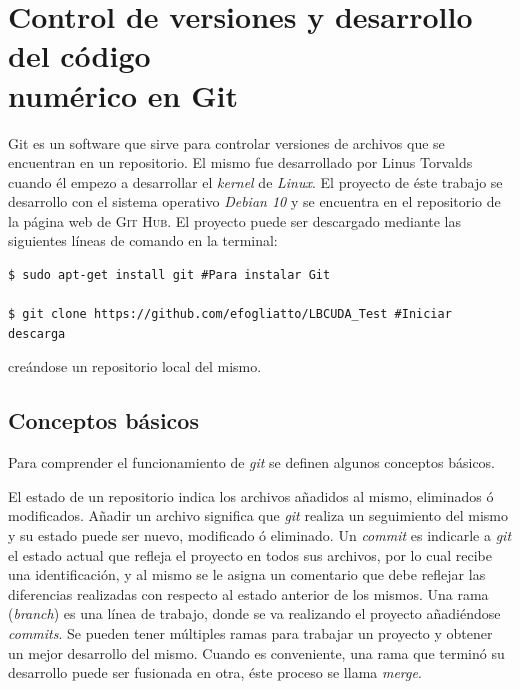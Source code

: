 \newpage
\section{Control de versiones y desarrollo del código \\ numérico en Git}
\label{sec:git}

Git es un software que sirve para controlar versiones de archivos que se encuentran en un repositorio. El mismo fue desarrollado por Linus Torvalds cuando él empezo a desarrollar el \textit{kernel} de \textit{Linux}. El proyecto de éste trabajo se desarrollo con el sistema operativo \textit{Debian 10} y se encuentra en el repositorio de la página web de \textsc{Git Hub}. El proyecto puede ser descargado mediante las siguientes líneas de comando en la terminal:

{\footnotesize
	\begin{frame}{}
		\begin{lstlisting}
$ sudo apt-get install git #Para instalar Git

$ git clone https://github.com/efogliatto/LBCUDA_Test #Iniciar descarga 
		\end{lstlisting}
		
	\end{frame}
}

creándose un repositorio local del mismo.

\subsection{Conceptos básicos}

Para comprender el funcionamiento de \textit{git} se definen algunos conceptos básicos. 

El estado de un repositorio indica los archivos añadidos al mismo, eliminados ó modificados. Añadir un archivo significa que \textit{git} realiza un seguimiento del mismo y su estado puede ser nuevo, modificado ó eliminado. Un \textit{commit} es indicarle a \textit{git} el estado actual que refleja el proyecto en todos sus archivos, por lo cual recibe una identificación, y al mismo se le asigna un comentario que debe reflejar las diferencias realizadas con respecto al estado anterior de los mismos. Una rama (\textit{branch}) es una línea de trabajo, donde se va realizando el proyecto añadiéndose \textit{commits}. Se pueden tener múltiples ramas para trabajar un proyecto y obtener un mejor desarrollo del mismo. Cuando es conveniente, una rama que terminó su desarrollo puede ser fusionada en otra, éste proceso se llama \textit{merge}.

